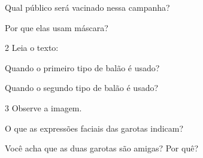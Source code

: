 
\begin{escolha}
\item Qual público será vacinado nessa campanha?


\item Por que elas usam máscara?

\end{escolha}

\pagebreak
\num{2} Leia o texto:

\begin{escolha}
\item Quando o primeiro tipo de balão é usado?


\item Quando o segundo tipo de balão é usado?

\end{escolha}

\pagebreak
\num{3} Observe a imagem.

\begin{escolha}
\item O que as expressões faciais das garotas indicam?


\item Você acha que as duas garotas são amigas? Por quê?

\end{escolha}

